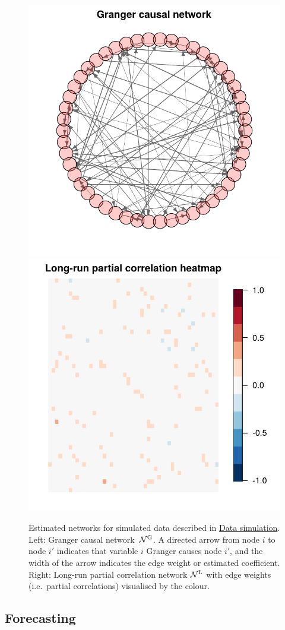 \begin{figure}
\centering
\includegraphics[width = .45\textwidth]{figs/Granger.pdf}
\includegraphics[width = .45\textwidth]{figs/Heatmap.pdf}
\caption{Estimated networks for simulated data described in \hyperref[sec:package:data]{Data simulation}.
Left: Granger causal network~$\mathcal N^{\text{\upshape{G}}}$. A directed arrow from node $i$ to node $i'$ indicates that variable $i$ Granger causes node $i'$, and the width of the arrow indicates the edge weight or estimated coefficient.
Right: Long-run partial correlation network $\mathcal N^{\text{\upshape{L}}}$ with edge weights (i.e.\ partial correlations) visualised by the colour.}
\label{figure:heatmap}
\end{figure}

\subsection{Forecasting}

